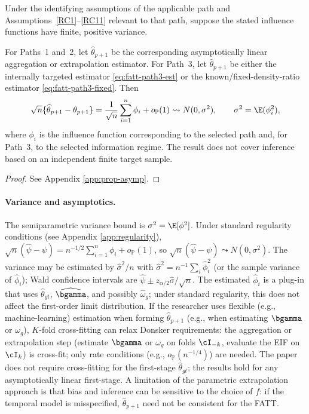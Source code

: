 \documentclass{article}
\renewcommand{\P}{\mathbb{P}}
\begin{document}
\begin{proposition}\label{prop:asymp}
Under the identifying assumptions of the applicable path and Assumptions~\ref{RC1}--\ref{RC11} relevant to that path, suppose the stated influence functions have finite, positive variance.

For Paths~1 and~2, let $\widehat{\theta}_{p+1}$ be the corresponding asymptotically linear aggregation or extrapolation estimator. For Path~3, let $\widehat{\theta}_{p+1}$ be either the internally targeted estimator \eqref{eq:fatt-path3-est} or the known/fixed-density-ratio estimator \eqref{eq:fatt-path3-fixed}. Then
\[
\sqrt n\{\widehat{\theta}_{p+1}-\theta_{p+1}\}
=
\frac{1}{\sqrt n}\sum_{i=1}^n\phi_i+o_{\P}(1)
\leadsto
N(0,\sigma^2),
\qquad
\sigma^2=\E(\phi_i^2),
\]
where $\phi_i$ is the influence function corresponding to the selected path and, for Path~3, to the selected information regime. The result does not cover inference based on an independent finite target sample.
\end{proposition}

\begin{proof}
See Appendix \ref{app:prop-asymp}.
\end{proof}

\paragraph{Variance and asymptotics.} The semiparametric variance bound is $\sigma^2 = \E[\phi^2]$. Under standard regularity conditions (see Appendix \ref{app:regularity}), $\sqrt{n}(\widehat{\psi} - \psi) = n^{-1/2}\sum_{i=1}^n \phi_i + o_{\P}(1)$, so $\sqrt{n}(\widehat{\psi} - \psi) \leadsto N(0, \sigma^2)$. The variance may be estimated by $\widehat{\sigma}^2/n$ with $\widehat{\sigma}^2 = n^{-1}\sum_i \widehat{\phi}_i^2$ (or the sample variance of $\widehat{\phi}_i$); Wald confidence intervals are $\widehat{\psi} \pm z_{\alpha/2} \widehat{\sigma}/\sqrt{n}$. The estimated $\widehat{\phi}_i$ is a plug-in that uses $\widehat{\theta}_{gt}$, $\widehat{\bgamma}$, and possibly $\widehat{\omega}_g$; under standard regularity, this does not affect the first-order limit distribution. If the researcher uses flexible (e.g., machine-learning) estimation when forming $\widehat{\theta}_{p+1}$ (e.g., when estimating $\bgamma$ or $\omega_g$), $K$-fold cross-fitting can relax Donsker requirements: the aggregation or extrapolation step (estimate $\bgamma$ or $\omega_g$ on folds $\cI_{-k}$, evaluate the EIF on $\cI_k$) is cross-fit; only rate conditions (e.g., $o_{\P}(n^{-1/4})$) are needed. The paper does not require cross-fitting for the first-stage $\widehat{\theta}_{gt}$; the results hold for any asymptotically linear first-stage. A limitation of the parametric extrapolation approach is that bias and inference can be sensitive to the choice of $f$: if the temporal model is misspecified, $\widehat{\theta}_{p+1}$ need not be consistent for the FATT.
\end{document}
